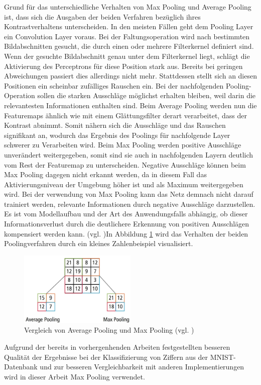 \documentclass[../main.tex]{subfiles}
\begin{document}
Grund für das unterschiedliche Verhalten von Max Pooling und Average Pooling ist, dass sich die Ausgaben der beiden Verfahren bezüglich ihres Kontrastverhaltens unterscheiden. In den meisten Fällen geht dem Pooling Layer ein Convolution Layer voraus. Bei der Faltungsoperation wird nach bestimmten Bildabschnitten gesucht, die durch einen oder mehrere Filterkernel definiert sind. Wenn der gesuchte Bildabschnitt genau unter dem Filterkernel liegt, schlägt die Aktivierung des Perceptrons für diese Position stark aus. Bereits bei geringen Abweichungen passiert dies allerdings nicht mehr. Stattdessen stellt sich an diesen Positionen ein scheinbar zufälliges Rauschen ein. Bei der nachfolgenden Pooling-Operation sollen die starken Ausschläge möglichst erhalten bleiben, weil darin die relevantesten Informationen enthalten sind. Beim Average Pooling werden nun die Featuremaps ähnlich wie mit einem Glättungsfilter derart verarbeitet, dass der Kontrast abnimmt. Somit nähern sich die Ausschläge und das Rauschen signifikant an, wodurch das Ergebnis des Poolings für nachfolgende Layer schwerer zu Verarbeiten wird. Beim Max Pooling werden positive Ausschläge unverändert weitergegeben, somit sind sie auch in nachfolgenden Layern deutlich vom Rest der Featuremap zu unterscheiden. Negative Ausschläge können beim Max Pooling dagegen nicht erkannt werden, da in diesem Fall das Aktivierungsniveau der Umgebung höher ist und als Maximum weitergegeben wird. Bei der verwendung von Max Pooling kann das Netz demnach nicht darauf trainiert werden, relevante Informationen durch negative Ausschläge darzustellen. Es ist vom Modellaufbau und der Art des Anwendungsfalls abhängig, ob dieser Informationsverlust durch die deutlichere Erkennung von positiven Ausschlägen kompensiert werden kann. (vgl. \cite{paperMixedPooling})In Abbildung \ref{pic:pooling_avg_max} wird das Verhalten der beiden Poolingverfahren durch ein kleines Zahlenbeispiel visualisiert. 
\begin{figure}
    \centering 
       \includegraphics[width=0.5\textwidth]{../images/Schmidt/pooling_avg_max.jpg} 
    \caption {Vergleich von Average Pooling und Max Pooling (vgl. \cite{articleCadenceCNN})} 
    \label{pic:pooling_avg_max} 
\end{figure} 
Aufgrund der bereits in vorhergenhenden Arbeiten festgestellten besseren Qualität der Ergebnisse bei der Klassifizierung von Ziffern aus der MNIST-Datenbank und zur besseren Vergleichbarkeit mit anderen Implementierungen wird in dieser Arbeit Max Pooling verwendet. 
\end{document}
